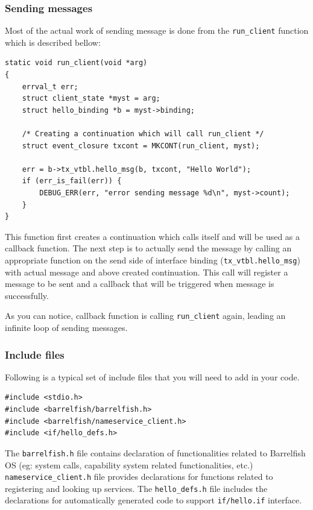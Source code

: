 \subsubsection{Sending messages}

Most of the actual work of sending message is done from the \texttt{run\_client}
function which is described bellow:

\begin{verbatim}
static void run_client(void *arg)
{
    errval_t err;
    struct client_state *myst = arg;
    struct hello_binding *b = myst->binding;

    /* Creating a continuation which will call run_client */
    struct event_closure txcont = MKCONT(run_client, myst);

    err = b->tx_vtbl.hello_msg(b, txcont, "Hello World");
    if (err_is_fail(err)) {
        DEBUG_ERR(err, "error sending message %d\n", myst->count);
    }
}
\end{verbatim}

This function first creates a continuation which calls itself
and will be used as a callback function. The next step is to actually
send the message by calling an appropriate function on the send side of
interface binding (\texttt{tx\_vtbl.hello\_msg}) with actual message
and above created continuation.  This call will register a message to be sent
and a callback that will be triggered when message is successfully.

As you can notice, callback function is calling \texttt{run\_client} again,
leading an infinite loop of sending messages.

\subsubsection{Include files}

Following is a typical set of include files that you will need to add
in your code.

\begin{verbatim}
#include <stdio.h>
#include <barrelfish/barrelfish.h>
#include <barrelfish/nameservice_client.h>
#include <if/hello_defs.h>
\end{verbatim}

The \texttt{barrelfish.h} file contains declaration of
functionalities related to Barrelfish OS (eg: system calls, capability
system related functionalities, etc.)
\texttt{nameservice\_client.h} file provides declarations for functions related
to registering and looking up services.  The \texttt{hello\_defs.h} file
includes the declarations for automatically generated code to support
\texttt{if/hello.if} interface.


